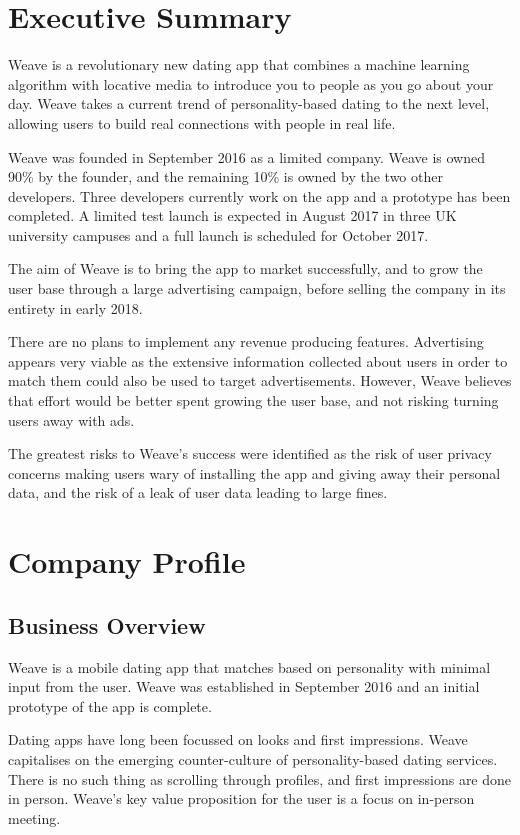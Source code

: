 \documentclass[12pt, a4paper]{article}
\newenvironment{main}
{\begin{spacing}{1.2}\setlength{\parskip}{0.5\baselineskip}}
{\end{spacing}\setlength{\parskip}{0pt}}
\begin{document}
\begin{main}
\section{Executive Summary}
Weave is a revolutionary new dating app that combines a machine learning algorithm with locative media to introduce you to people as you go about your day. Weave takes a current trend of personality-based dating to the next level, allowing users to build real connections with people in real life.

Weave was founded in September 2016 as a limited company. Weave is owned 90\% by the founder, and the remaining 10\% is owned by the two other developers. Three developers currently work on the app and a prototype has been completed. A limited test launch is expected in August 2017 in three UK university campuses and a full launch is scheduled for October 2017.

The aim of Weave is to bring the app to market successfully, and to grow the user base through a large advertising campaign, before selling the company in its entirety in early 2018.

There are no plans to implement any revenue producing features. Advertising appears very viable as the extensive information collected about users in order to match them could also be used to target advertisements. However, Weave believes that effort would be better spent growing the user base, and not risking turning users away with ads.

The greatest risks to Weave's success were identified as the risk of user privacy concerns making users wary of installing the app and giving away their personal data, and the risk of a leak of user data leading to large fines.

\section{Company Profile}
\subsection{Business Overview}
Weave is a mobile dating app that matches based on personality with minimal input from the user. Weave was established in September 2016 and an initial prototype of the app is complete.

Dating apps have long been focussed on looks and first impressions. Weave capitalises on the emerging counter-culture of personality-based dating services. There is no such thing as scrolling through profiles, and first impressions are done in person. Weave's key value proposition for the user is a focus on in-person meeting.


\end{main}
\end{document}
